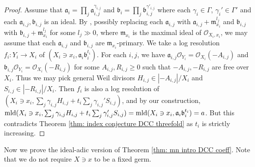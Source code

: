 \documentclass[11pt]{amsart}
\numberwithin{equation}{section}
\newcommand{\aaa}{\mathfrak{a}}
\newcommand{\bbb}{\mathfrak{b}}
\newcommand{\mmm}{\mathfrak{m}}
\newcommand{\mld}{{\rm{mld}}}
\newcommand{\Ii}{{\Gamma}}
\theoremstyle{definition}
\theoremstyle{definition}
\begin{document}
\begin{proof}
Assume that $\aaa_i=\prod_j\aaa_{i,j}^{\gamma_{i,j}}$ and $\bbb_i=\prod_j\bbb_{i,j}^{\gamma'_{i,j}}$ where each $\gamma_i\in\Ii$, $\gamma_i'\in\Ii'$ and each $\aaa_{i,j},\bbb_{i,j}$ is an ideal. By \cite[Proposition 2.2 iv)]{MN18}, possibly replacing each $\aaa_{i,j}$ with $\aaa_{i,j}+\mmm_{x_i}^{l_j}$ and $\bbb_{i,j}$ with $\bbb_{i,j}+\mmm_{x_i}^{l_j}$ for some $l_j\gg 0$, where $\mmm_{x_i}$ is the maximal ideal of $\mathcal{O}_{X_i,x_i}$, we may assume that each $\aaa_{i,j}$ and $\bbb_{i,j}$ are $\mmm_{x_i}$-primary. We take a log resolution $f_i: Y_i\rightarrow X_i$ of $(X_i\ni x_i,\aaa_i\bbb^{t_i}_i)$. For each $i,j$, we have $\aaa_{i,j}\mathcal{O}_{Y_i}=\mathcal{O}_{X_i}(-A_{i,j})$ and $\bbb_{i,j}\mathcal{O}_{Y_i}=\mathcal{O}_{X_i}(-R_{i,j})$ for some $A_{i,j},R_{i,j}\geq 0$ such that $-A_{i,j},-R_{i,j}$ are free over $X_i$. Thus we may pick general Weil divisors $H_{i,j}\in |-A_{i,j}|/X_i$ and $S_{i,j}\in |-R_{i,j}|/X_i$. Then $f_i$ is also a log resolution of $(X_i\ni x_i,\sum_j\gamma_{i,j}H_{i,j}+t_i\sum_j\gamma_{i,j}'S_{i,j})$, and by our construction, $\mld(X_i\ni x_i,\sum_j\gamma_{i,j}H_{i,j}+t_i\sum_j\gamma_{i,j}'S_{i,j})=\mld(X_i\ni x_i,\aaa_i\bbb_i^{t_i})=a$. But this contradicts Theorem \ref{thm: index conjecture DCC threefold} as $t_i$ is strictly increasing.
\end{proof}

Now we prove the ideal-adic version of Theorem \ref{thm: mn intro DCC coeff}. Note that we do not require $X\ni x$ to be a fixed germ.
\end{document}
